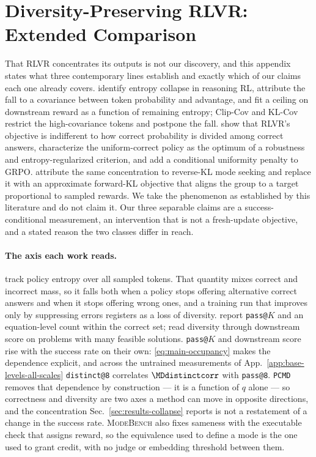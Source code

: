 \documentclass{article}
\makeatletter
\newcommand{\1}{\mathbf 1}
\newcommand{\mb}{\textsc{ModeBench}}
\newcommand{\pmd}{\texttt{PCMD}}
\newcommand{\distk}{\texttt{distinct@8}}
\theoremstyle{remark}
\theoremstyle{definition}
\theoremstyle{plain}
\makeatother
\begin{document}
\section{Diversity-Preserving RLVR: Extended Comparison}
\label{app:related-extended}

That RLVR concentrates its outputs is not our discovery, and this appendix
states what three contemporary lines establish and exactly which of our claims
each one already covers.
\citet{cui2025entropy} identify entropy collapse in reasoning RL, attribute the
fall to a covariance between token probability and advantage, and fit a ceiling
on downstream reward as a function of remaining entropy; Clip-Cov and KL-Cov
restrict the high-covariance tokens and postpone the fall.
\citet{lochab2026ucpo} show that RLVR's objective is indifferent to how correct
probability is divided among correct answers, characterize the uniform-correct
policy as the optimum of a robustness and entropy-regularized criterion, and
add a conditional uniformity penalty to GRPO.
\citet{li2026distribution} attribute the same concentration to reverse-KL
mode seeking and replace it with an approximate forward-KL objective that
aligns the group to a target proportional to sampled rewards.
We take the phenomenon as established by this literature and do not claim it.
Our three separable claims are a success-conditional measurement, an
intervention that is not a fresh-update objective, and a stated reason the two
classes differ in reach.

\paragraph{The axis each work reads.}
\citet{cui2025entropy} track policy entropy over all sampled tokens. That
quantity mixes correct and incorrect mass, so it falls both when a policy stops
offering alternative correct answers and when it stops offering wrong ones, and
a training run that improves only by suppressing errors registers as a loss of
diversity. \citet{lochab2026ucpo} report \texttt{pass@}$K$ and an
equation-level count within the correct set; \citet{li2026distribution} read
diversity through downstream score on problems with many feasible solutions.
\texttt{pass@}$K$ and downstream score rise with the success rate on their
own: \eqref{eq:main-occupancy} makes the dependence explicit, and across the
\MDcells{} untrained measurements of App.~\ref{app:base-levels-all-scales}
\distk{} correlates $\MDdistinctcorr$ with \texttt{pass@8}.
\pmd{} removes that dependence by construction --- it is a function of $q$
alone --- so correctness and diversity are two axes a method can move in opposite
directions, and the concentration Sec.~\ref{sec:results-collapse} reports is
not a restatement of a change in the success rate. \mb{} also fixes sameness with the executable check that assigns
reward, so the equivalence used to define a mode is the one used to grant
credit, with no judge or embedding threshold between them.
\end{document}
